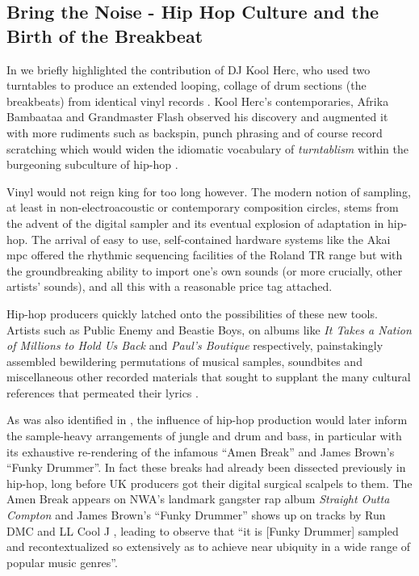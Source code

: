 \subsection{Bring the Noise - Hip Hop Culture and the Birth of the Breakbeat}

In  we briefly highlighted the contribution of DJ Kool Herc, who used two turntables to produce an extended looping, collage of drum sections (the breakbeats) from identical vinyl records \citep{Forman2004}. Kool Herc's contemporaries, Afrika Bambaataa and Grandmaster Flash observed his discovery and augmented it with more rudiments such as backspin, punch phrasing and of course record scratching which would widen the idiomatic vocabulary of \textit{turntablism} within the burgeoning subculture of hip-hop \citep{Smith2000}.

Vinyl would not reign king for too long however. The modern notion of sampling, at least in non-electroacoustic or contemporary composition circles, stems from the advent of the digital sampler and its eventual explosion of adaptation in hip-hop. The arrival of easy to use, self-contained hardware systems like the Akai \acrfull{mpc} offered the rhythmic sequencing facilities of the Roland TR range but with the groundbreaking ability to import one's own sounds (or more crucially, other artists' sounds), and all this with a reasonable price tag \citep{Rodgers2003} attached.

Hip-hop producers quickly latched onto the possibilities of these new tools. Artists such as Public Enemy and Beastie Boys, on albums like \textit{It Takes a Nation of Millions to Hold Us Back} and \textit{Paul's Boutique} respectively, painstakingly assembled bewildering permutations of musical samples, soundbites and miscellaneous other recorded materials that sought to supplant the many cultural references that permeated their lyrics \citep{Sewell2013, Sewell2014}. 

As was also identified in , the influence of hip-hop production would later inform the sample-heavy arrangements of jungle and drum and bass, in particular with its exhaustive re-rendering of the infamous ``Amen Break'' and James Brown's ``Funky Drummer''. In fact these breaks had already been dissected previously in hip-hop, long before UK producers got their digital surgical scalpels to them. The Amen Break appears on NWA's landmark gangster rap album \textit{Straight Outta Compton} and James Brown's ``Funky Drummer'' shows up on tracks by Run DMC and LL Cool J \citep{Frane2017}, leading \cite{Oliver2015} to observe that ``it is [Funky Drummer] sampled and recontextualized so extensively as to achieve near ubiquity in a wide range of popular music genres''.

